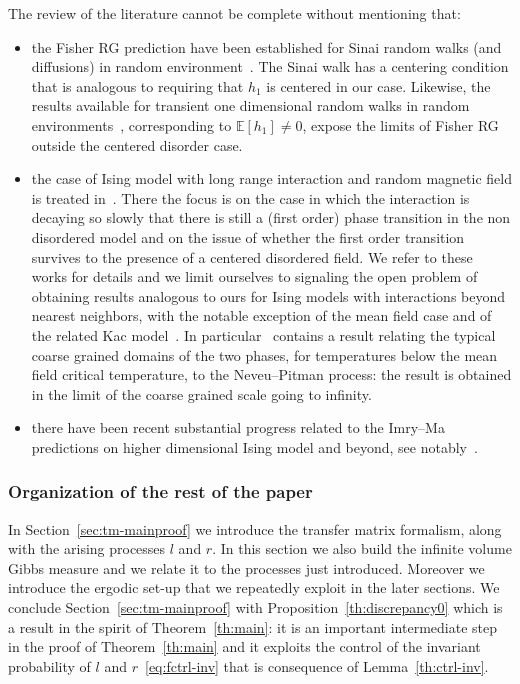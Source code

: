 \documentclass[AHL,Unicode,longabstracts,published]{cedram}
\newcommand{\bbE}{\mathbb{E}}
\begin{document}
The review of the literature cannot be complete without mentioning that:
\begin{itemize}
\item the Fisher RG prediction have been established for Sinai random walks (and diffusions) in random environment~\cite{cf:BF08,cf:Cheliotis}. The Sinai walk has a centering condition that is analogous to requiring that $h_1$ is centered in our case. Likewise, the results available for transient one dimensional random walks in random environments~\cite{cf:ESZ}, corresponding to $\bbE[h_1]\neq 0$, expose the limits of Fisher RG outside the centered disorder case.
\item the case of Ising model with long range interaction and random magnetic field is treated in~\cite{cf:AW,cf:COP1,cf:COP2,cf:DingHuandMaia}. There the focus is on the case in which the interaction is decaying so slowly that there is still a (first order) phase transition in the non disordered model and on the issue of whether the first order transition survives to the presence of a centered disordered field. We refer to these works for details and we limit ourselves to signaling the open problem of obtaining results analogous to ours for Ising models with interactions beyond nearest neighbors, with the notable exception of the mean field case and of the related Kac model~\cite{cf:COP0,cf:OP2009}. In particular~\cite{cf:OP2009} contains a result relating the typical coarse grained domains of the two phases, for temperatures below the mean field critical temperature, to the Neveu--Pitman process: the result is obtained in the limit of the coarse grained scale going to infinity.
\item there have been recent substantial progress related to the Imry--Ma predictions on higher dimensional Ising model and beyond, see notably~\cite{cf:AHP,cf:DingXia,cf:DingZhuang}.
\end{itemize}



\subsubsection{Organization of the rest of the paper}

In Section~\ref{sec:tm-mainproof} we introduce the transfer matrix formalism, along with the arising processes $l$ and $r$. In this section we also build the infinite volume Gibbs measure and we relate it to the processes just introduced. Moreover we introduce the ergodic set-up that we repeatedly exploit in the later sections. We conclude Section~\ref{sec:tm-mainproof} with Proposition~\ref{th:discrepancy0} which is a result in the spirit of Theorem~\ref{th:main}: it is an important intermediate step in the proof of Theorem~\ref{th:main} and it exploits the control of the invariant probability of $l$ and $r$~\eqref{eq:fctrl-inv} that is consequence of Lemma~\ref{th:ctrl-inv}.
\end{document}
